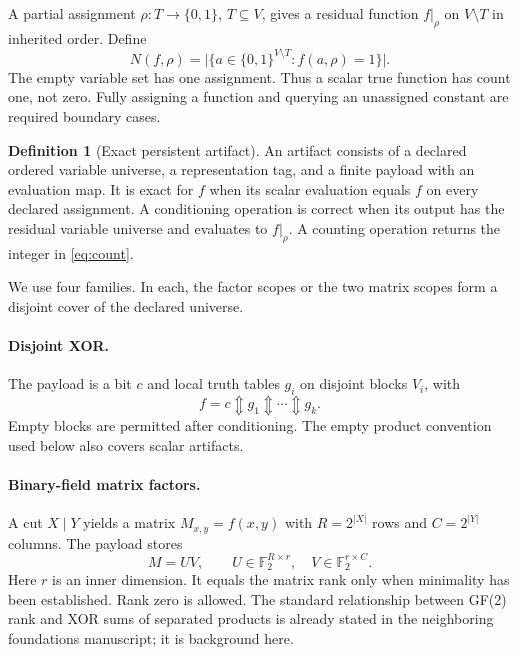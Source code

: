 \documentclass[11pt]{article}
\newcommand{\F}{\mathbb F_2}
\newcommand{\B}{\{0,1\}}
\newcommand{\xor}{\mathbin{\Updownarrow}}
\theoremstyle{definition}\newtheorem{definition}[theorem]{Definition}
\theoremstyle{remark}\newtheorem{remark}[theorem]{Remark}
\begin{document}
A partial assignment $\rho:T\to\B$, $T\subseteq V$, gives a residual function $f|_\rho$ on $V\setminus T$ in inherited order. Define
\begin{equation}
 N(f,\rho)=\bigl|\{a\in\B^{V\setminus T}:f(a,\rho)=1\}\bigr|.
 \label{eq:count}
\end{equation}
The empty variable set has one assignment. Thus a scalar true function has count one, not zero. Fully assigning a function and querying an unassigned constant are required boundary cases.

\begin{definition}[Exact persistent artifact]
An artifact consists of a declared ordered variable universe, a representation tag, and a finite payload with an evaluation map. It is exact for $f$ when its scalar evaluation equals $f$ on every declared assignment. A conditioning operation is correct when its output has the residual variable universe and evaluates to $f|_\rho$. A counting operation returns the integer in \eqref{eq:count}.
\end{definition}

We use four families. In each, the factor scopes or the two matrix scopes form a disjoint cover of the declared universe.

\paragraph{Disjoint XOR.}
The payload is a bit $c$ and local truth tables $g_i$ on disjoint blocks $V_i$, with
\begin{equation}
 f=c\xor g_1\xor\cdots\xor g_k.
 \label{eq:xor}
\end{equation}
Empty blocks are permitted after conditioning. The empty product convention used below also covers scalar artifacts.

\paragraph{Binary-field matrix factors.}
A cut $X\mid Y$ yields a matrix $M_{x,y}=f(x,y)$ with $R=2^{|X|}$ rows and $C=2^{|Y|}$ columns. The payload stores
\begin{equation}
 M=UV,\qquad U\in\F^{R\times r},\quad V\in\F^{r\times C}.
 \label{eq:rankfactor}
\end{equation}
Here $r$ is an inner dimension. It equals the matrix rank only when minimality has been established. Rank zero is allowed. The standard relationship between GF(2) rank and XOR sums of separated products is already stated in the neighboring foundations manuscript\cite{foundations}; it is background here.
\end{document}
